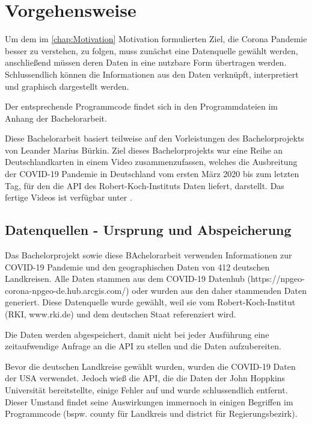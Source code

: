\chapter{Vorgehensweise}\label{chap:Vorgehensweise}
Um dem im \autoref{chap:Motivation} \glqq{}Motivation\grqq{} formulierten Ziel, die Corona Pandemie besser zu verstehen, zu folgen, muss zunächst eine Datenquelle gewählt werden, anschließend müssen deren Daten in eine nutzbare Form übertragen werden. Schlussendlich können die Informationen aus den Daten verknüpft, interpretiert und graphisch dargestellt werden.

Der entsprechende Programmcode findet sich in den Programmdateien im Anhang der Bachelorarbeit. 

Diese Bachelorarbeit basiert teilweise auf den Vorleistungen des Bachelorprojekts von Leander Marius Bürkin.
Ziel dieses Bachelorprojekts war eine Reihe an Deutschlandkarten in einem Video zusammenzufassen, welches die Ausbreitung der COVID-19 Pandemie in Deutschland vom ersten März 2020 bis zum letzten Tag, für den die API des Robert-Koch-Instituts Daten liefert, darstellt.
Das fertige Videos ist verfügbar unter .

\section{Datenquellen - Ursprung und Abspeicherung}\label{sec:Datenquelle}

Das Bachelorprojekt sowie diese BAchelorarbeit verwenden Informationen zur COVID-19 Pandemie und den geographischen Daten von 412 deutschen Landkreisen. Alle Daten stammen aus dem \glqq{}COVID-19 Datenhub\grqq{} (https://npgeo-corona-npgeo-de.hub.arcgis.com/) oder wurden aus den daher stammenden Daten generiert. Diese Datenquelle wurde gewählt, weil sie vom Robert-Koch-Institut (RKI, www.rki.de) und dem deutschen Staat referenziert wird.

Die Daten werden abgespeichert, damit nicht bei jeder Ausführung eine zeitaufwendige Anfrage an die API zu stellen und die Daten aufzubereiten.

Bevor die deutschen Landkreise gewählt wurden, wurden die COVID-19 Daten der USA verwendet. Jedoch wieß die API, die die Daten der John Hoppkins Universität bereitstellte, einige Fehler auf und wurde schlussendlich entfernt.
Dieser Umstand findet seine Auswirkungen immernoch in einigen Begriffen im Programmcode (bspw. \glqq{}county\grqq{} für Landkreis und \glqq{}district\grqq{} für Regierungsbezirk).

